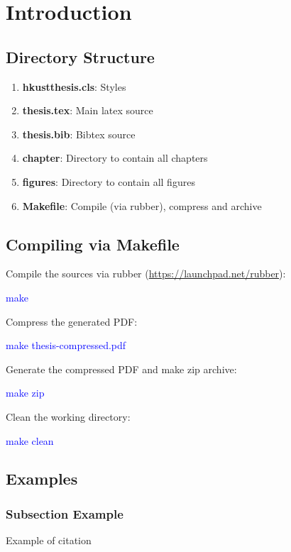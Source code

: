 \chapter{Introduction}
\section{Directory Structure}
\begin{enumerate}
    \item {\bf hkustthesis.cls}: Styles
    \item {\bf thesis.tex}: Main latex source
    \item {\bf thesis.bib}: Bibtex source
    \item {\bf chapter}: Directory to contain all chapters
    \item {\bf figures}: Directory to contain all figures
    \item {\bf Makefile}: Compile (via rubber), compress and archive
\end{enumerate}

\section{Compiling via Makefile}
Compile the sources via rubber (\url{https://launchpad.net/rubber}):

\textcolor{blue}{make}

Compress the generated PDF:

\textcolor{blue}{make thesis-compressed.pdf}

Generate the compressed PDF and make zip archive:

\textcolor{blue}{make zip}

Clean the working directory:

\textcolor{blue}{make clean}

\section{Examples}
\subsection{Subsection Example}
Example of citation \cite{citationkey}


